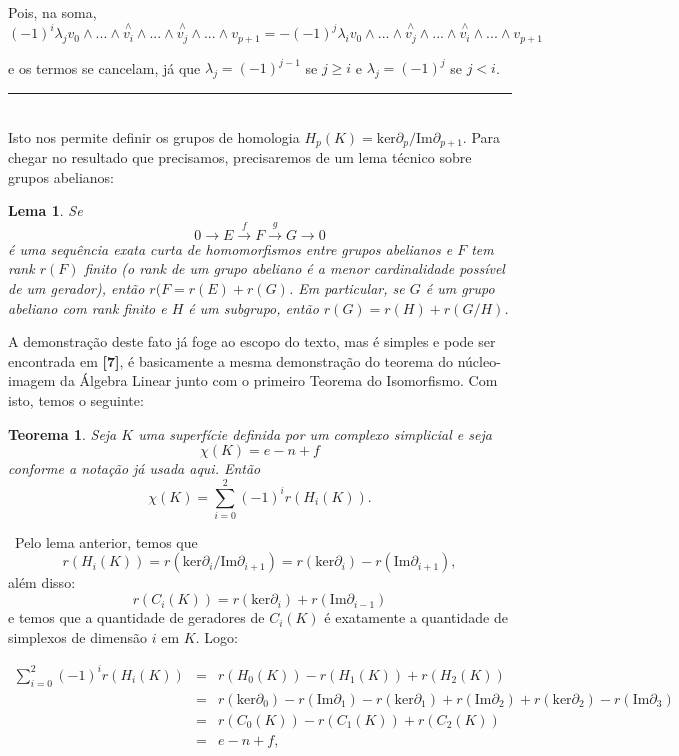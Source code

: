 \documentclass[12pt,a4paper]{article}
\newtheorem{lem}[mydef]{Lema}
\newtheorem{thrm}[mydef]{Teorema}
\def\dem{\par\smallbreak\noindent {\textit{ Demonstração:}} \ }
\def\eop{\hfill\rule{2.5mm}{2.5mm} \\ }
\theoremstyle{definition}
\begin{document}
Pois, na soma, $$  (-1)^{i} \lambda_j v_0 \wedge ... \wedge \overset{ \wedge}{v_i} \wedge ... \wedge  \overset{ \wedge}{v_j}\wedge ... \wedge  v_{p+1} = - (-1)^{j} \lambda_i v_0 \wedge ... \wedge \overset{ \wedge}{v_j} \wedge ... \wedge  \overset{ \wedge}{v_i}\wedge ... \wedge  v_{p+1} $$

e os termos se cancelam, já que $\lambda_j=(-1)^{j-1}$ se $j\geq i$ e $\lambda_j=(-1)^{j}$ se $j< i$. \eop

Isto nos permite definir os grupos de homologia $H_p(K)=\text{ker}\partial_p / \text{Im} \partial_{p+1}$. Para chegar no resultado que precisamos, precisaremos de um lema técnico sobre grupos abelianos:

\begin{lem}

    Se $$0 \rightarrow E \overset{f}{\rightarrow} F \overset{g}{\rightarrow} G \rightarrow 0$$ é uma sequência exata curta de homomorfismos entre grupos abelianos e $F$ tem rank $r(F)$ finito (o rank de um grupo abeliano é a menor cardinalidade possível de um gerador), então $r(F=r(E)+r(G)$. Em particular, se $G$ é um grupo abeliano com rank finito e $H$ é um subgrupo, então $r(G)= r(H)+r(G/H)$.

\end{lem}

A demonstração deste fato já foge ao escopo do texto, mas é simples e pode ser encontrada em \textbf{[7]}, é basicamente a mesma demonstração do teorema do núcleo-imagem da Álgebra Linear junto com o primeiro Teorema do Isomorfismo. Com isto, temos o seguinte:

\begin{thrm}
  
    Seja $K$ uma superfície definida por um complexo simplicial e seja $$\chi(K)=e-n+f$$ conforme a notação já usada aqui. Então $$\chi(K)=\sum_{i=0}^{2} (-1)^i r(H_i(K)).$$
  
\end{thrm}

\dem Pelo lema anterior, temos que $$r(H_i(K))=r(\text{ker}\partial_i / \text{Im} \partial_{i+1}) = r(\text{ker}\partial_i)-r(\text{Im} \partial_{i+1}),$$ além disso: $$r(C_i(K)) =r(\text{ker}\partial_i)+r(\text{Im} \partial_{i-1})$$ e temos que a quantidade de geradores de $C_i(K)$ é exatamente a quantidade de simplexos de dimensão $i$ em $K$. Logo:

$$\begin{array}{rcl}
   \displaystyle\sum_{i=0}^{2} (-1)^i r(H_i(K)) & = & r(H_0(K))- r(H_1(K))+r(H_2(K))\\
     & = &  r(\text{ker}\partial_0)-r(\text{Im} \partial_{1})- r(\text{ker}\partial_1)+r(\text{Im} \partial_{2})+r(\text{ker}\partial_2)-r(\text{Im} \partial_{3})\\
     & = & r(C_0(K))-r(C_1(K))+r(C_2(K))\\
     & = & e-n+f,
\end{array}$$
\end{document}
